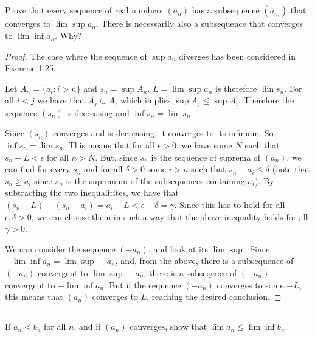 \subsection{} Prove that every sequence of real numbers $(a_n)$ has a  subsequence $(a_{n_t})$ that converges to $\lim \sup a_n$. There is necessarily also a subsequence that converges to $\lim \inf a_n$. Why?

\begin{proof}
The case where the sequence of $\sup a_n$ diverges has been considered in Exercise 1.25.


Let $A_n = \{a_i: i > n\}$ and $s_n = \sup A_n$. $L = \lim \sup a_n$ is therefore $\lim s_n$. For all $i < j$ we have that $A_j \subset A_i$ which implies $\sup A_j \leq \sup A_i$. Therefore the sequence $(s_n)$ is decreasing and $\inf s_n = \lim s_n$.

Since $(s_n)$ converges and is decreasing, it converges to its infimum. So $\inf s_n = \lim s_n$. This means that for all $\epsilon > 0$, we have some $N$ such that $s_n - L < \epsilon$ for all $n > N$. But, since $s_n$ is the sequence of suprema of $(a_n)$, we can find for every $s_n$ and for all $\delta>0$ some $i>n$ such that $s_n - a_i \leq \delta$ (note that $s_n \geq a_i$ since $s_n$ is the supremum of the subsequences containing $a_i$). By subtracting the two inequalitites, we have that $(s_n - L) - (s_n - a_i) = a_i - L < \epsilon - \delta = \gamma$. Since this has to hold for all $\epsilon, \delta>0$, we can choose them in such a way that the above inequality holds for all $\gamma>0$.



We can consider the sequence $(-a_n)$, and look at its $\lim \sup$. Since $-\lim \inf a_n = \lim \sup -a_n$, and, from the above, there is a subsequence of $(-a_n)$ convergent to $\lim \sup -a_n$, there is a subseqence of $(-a_n)$ convergent to $-\lim \inf a_n$. But if the sequence $(-a_n)$ converges to some $-L$, this means that $(a_n)$ converges to $L$, reaching the desired conclusion.
\end{proof}





\subsection{} If $a_n < b_n$ for all $n$, and if $(a_n)$ converges, show  that $\lim a_n \leq \lim \inf b_n$.


